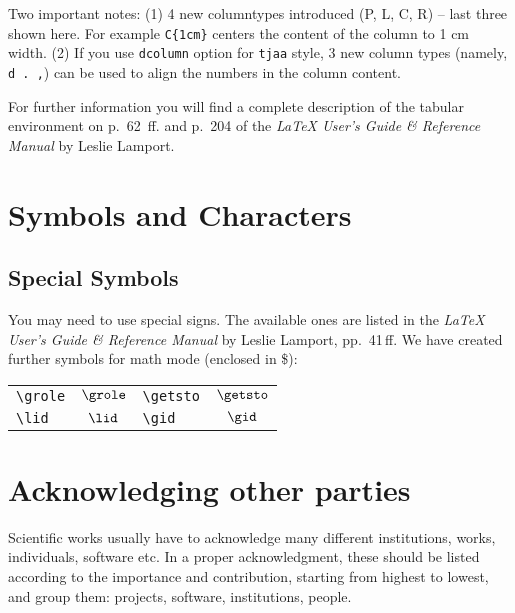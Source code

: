 \documentclass[usenatbib]{tjaa}
\begin{document}
Two important notes:
(1) 4 new columntypes introduced (P, L, C, R) -- last three
shown here.
For example \verb|C{1cm}| centers the content of the column to 1 cm width.
(2) If you use \verb|dcolumn| option for \verb|tjaa| style, 3 new column types
(namely, \verb|d . ,|) can be used to align the numbers in the column content.

For further information you will find a complete description of the tabular
environment on p.~62~ff. and p.~204 of the {\em \LaTeX{} User's Guide \&
Reference Manual\/} by Leslie Lamport.

\section{Symbols and Characters}

\subsection*{Special Symbols}

You may need to use special signs.  The available ones are listed in the {\em
\LaTeX{} User's Guide \& Reference Manual\/} by Leslie Lamport, pp.~41\,ff. We
have created further symbols for math mode (enclosed in \$):
\begin{center}
\begin{tabular}{l@{\hspace{1em}yields\hspace{1em}}
c@{\hspace{3em}}l@{\hspace{1em}yields\hspace{1em}}c}
\verb|\grole| & $\grole$ & \verb|\getsto| & $\getsto$\\
\verb|\lid|   & $\lid$   & \verb|\gid|    & $\gid$
\end{tabular}
\end{center}
\newpage

\section{Acknowledging other parties}

Scientific works usually have to acknowledge many different institutions,
works, individuals, software etc.
In a proper acknowledgment, these should be listed according to the
importance and contribution, starting from highest to lowest, and group them:
projects, software, institutions, people.
\end{document}
